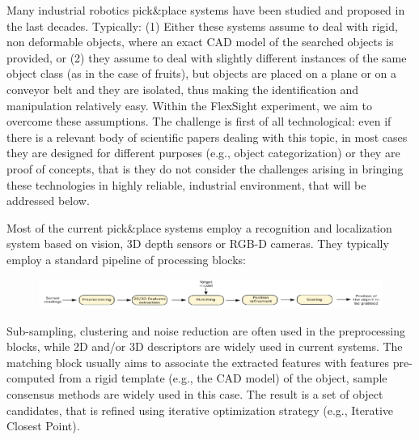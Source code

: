 Many industrial robotics pick\&place systems have been studied and proposed in the last decades. Typically: (1) Either these systems assume to deal with rigid, non deformable objects, where an exact CAD model of the searched objects is provided, or (2) they assume to deal with slightly different instances of the same object class (as in the case of fruits), but objects are placed on a plane or on a conveyor belt and they are isolated, thus making the identification and manipulation relatively easy. Within the FlexSight experiment, we aim to overcome these assumptions. The challenge is first of all technological: even if there is a relevant body of scientific papers dealing with this topic, in most cases they are designed for different purposes (e.g., object categorization) or they are proof of concepts, that is they do not consider the challenges arising in bringing these technologies in highly reliable, industrial environment, that will be addressed below.

Most of the current pick\&place systems employ a recognition and localization system based on vision, 3D depth sensors or RGB-D cameras. They typically employ a standard pipeline of processing blocks:

\begin{figure}[!hbt]
    \centering
    \includegraphics[width=\textwidth]{figures/Appendix/flex_1.png} 
    \label{fig:flex_1}
\end{figure}

Sub-sampling, clustering and noise reduction are often used in the preprocessing blocks, while 2D and/or 3D descriptors are widely used in current systems. The matching block usually aims to associate the extracted features with features pre-computed from a rigid template (e.g., the CAD model) of the object, sample consensus methods are widely used in this case. The result is a set of object candidates, that is refined using iterative optimization strategy (e.g., Iterative Closest Point).

